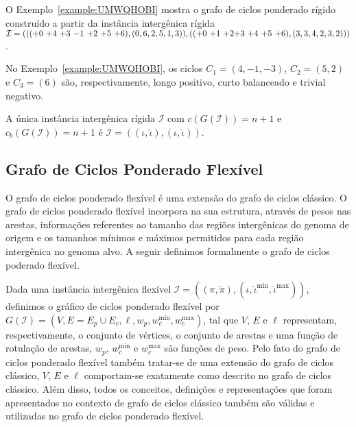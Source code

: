 O Exemplo~\ref{example:UMWQHOBI} mostra o grafo de ciclos ponderado rígido construído a partir da instância intergênica rígida $\mathcal{I} = ((({+0}~{+4}~{+3}~{-1}~{+2}~{+5}~{+6}),(0,6,2,5,1,3)),(({+0}~{+1}~{+2}\break{+3}~{+4}~{+5}~{+6}),(3,3,4,2,3,2)))$.



No Exemplo~\ref{example:UMWQHOBI}, os ciclos $C_1=(4,-1,-3)$, $C_2 = (5,2)$ e $C_3 = (6)$ são, respectivamente, longo positivo, curto balanceado e trivial negativo.

\begin{remark}\label{remark:WVLFPRDL}
  A única instância intergênica rígida $\mathcal{I}$ com $c(G(\mathcal{I})) = n + 1$ e $c_b(G(\mathcal{I})) = n + 1$ é $\mathcal{I} = ((\iota,\breve\iota),(\iota,\breve\iota))$.
\end{remark}

\subsection{Grafo de Ciclos Ponderado Flexível}

O grafo de ciclos ponderado flexível é uma extensão do grafo de ciclos clássico. O grafo de ciclos ponderado flexível incorpora na sua estrutura, através de pesos nas arestas, informações referentes ao tamanho das regiões intergênicas do genoma de origem e os tamanhos mínimos e máximos permitidos para cada região intergênica no genoma alvo. A seguir definimos formalmente o grafo de ciclos poderado flexível.

Dada uma instância intergênica flexível $\mathcal{I} = ((\pi,\breve\pi),(\iota,\breve\iota^{\min},\breve\iota^{\max}))$, definimos o gráfico de ciclos ponderado flexível por $G(\mathcal{I}) = (V, E=E_p \cup E_c, \ell, w_p, w^{\min}_c, w^{\max}_c)$, tal que $V$, $E$ e $\ell$ representam, respectivamente, o conjunto de vértices, o conjunto de arestas e uma função de rotulação de arestas, $w_p$, $w^{\min}_c$ e $w^{\max}_c$ são funções de peso. Pelo fato do grafo de ciclos ponderado flexível também tratar-se de uma extensão do grafo de ciclos clássico, $V$, $E$ e $\ell$ comportam-se exatamente como descrito no grafo de ciclos clássico. Além disso, todos os conceitos, definições e representações que foram apresentados no contexto de grafo de ciclos clássico também são válidas e utilizadas no grafo de ciclos ponderado flexível.

